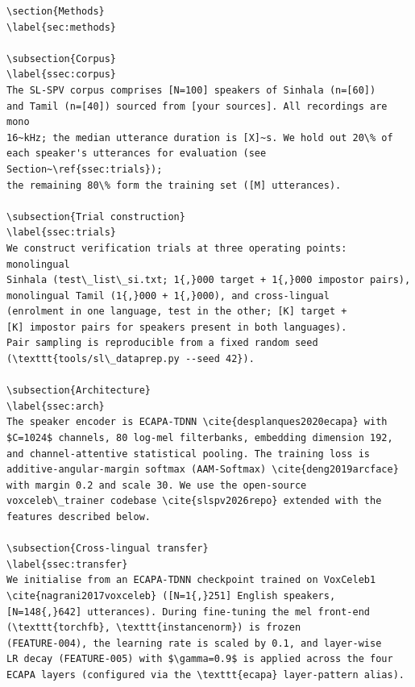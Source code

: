 \documentclass[10pt,a4paper]{article}
\begin{document}
\begin{Verbatim}[fontsize=\small,frame=single,framesep=4pt]
\section{Methods}
\label{sec:methods}

\subsection{Corpus}
\label{ssec:corpus}
The SL-SPV corpus comprises [N=100] speakers of Sinhala (n=[60])
and Tamil (n=[40]) sourced from [your sources]. All recordings are mono
16~kHz; the median utterance duration is [X]~s. We hold out 20\% of
each speaker's utterances for evaluation (see Section~\ref{ssec:trials});
the remaining 80\% form the training set ([M] utterances).

\subsection{Trial construction}
\label{ssec:trials}
We construct verification trials at three operating points: monolingual
Sinhala (test\_list\_si.txt; 1{,}000 target + 1{,}000 impostor pairs),
monolingual Tamil (1{,}000 + 1{,}000), and cross-lingual
(enrolment in one language, test in the other; [K] target +
[K] impostor pairs for speakers present in both languages).
Pair sampling is reproducible from a fixed random seed
(\texttt{tools/sl\_dataprep.py --seed 42}).

\subsection{Architecture}
\label{ssec:arch}
The speaker encoder is ECAPA-TDNN \cite{desplanques2020ecapa} with
$C=1024$ channels, 80 log-mel filterbanks, embedding dimension 192,
and channel-attentive statistical pooling. The training loss is
additive-angular-margin softmax (AAM-Softmax) \cite{deng2019arcface}
with margin 0.2 and scale 30. We use the open-source
voxceleb\_trainer codebase \cite{slspv2026repo} extended with the
features described below.

\subsection{Cross-lingual transfer}
\label{ssec:transfer}
We initialise from an ECAPA-TDNN checkpoint trained on VoxCeleb1
\cite{nagrani2017voxceleb} ([N=1{,}251] English speakers,
[N=148{,}642] utterances). During fine-tuning the mel front-end
(\texttt{torchfb}, \texttt{instancenorm}) is frozen
(FEATURE-004), the learning rate is scaled by 0.1, and layer-wise
LR decay (FEATURE-005) with $\gamma=0.9$ is applied across the four
ECAPA layers (configured via the \texttt{ecapa} layer-pattern alias).


\end{Verbatim}
\end{document}
